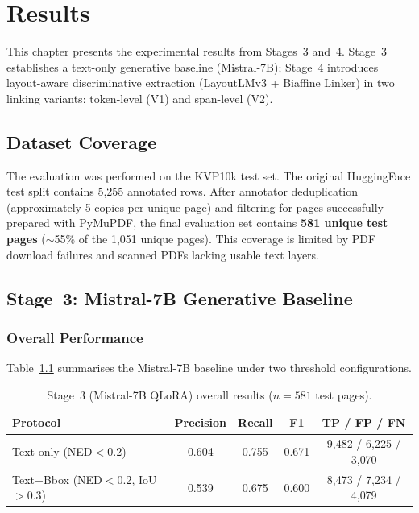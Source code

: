 \chapter{Results}
\label{ch:results}

This chapter presents the experimental results from Stages~3 and~4. Stage~3
establishes a text-only generative baseline (Mistral-7B); Stage~4 introduces
layout-aware discriminative extraction (LayoutLMv3 + Biaffine Linker) in two
linking variants: token-level (V1) and span-level (V2).

\section{Dataset Coverage}
\label{sec:dataset-coverage}

The evaluation was performed on the KVP10k test set. The original HuggingFace
test split contains 5{,}255 annotated rows. After annotator deduplication
(approximately 5 copies per unique page) and filtering for pages successfully
prepared with PyMuPDF, the final evaluation set contains \textbf{581 unique
test pages} ($\sim$55\% of the 1{,}051 unique pages). This coverage is
limited by PDF download failures and scanned PDFs lacking usable text layers.

\section{Stage~3: Mistral-7B Generative Baseline}
\label{sec:stage3-results}

\subsection{Overall Performance}

Table~\ref{tab:stage3-overall} summarises the Mistral-7B baseline under two
threshold configurations.

\begin{table}[ht]
  \centering
  \caption{Stage~3 (Mistral-7B QLoRA) overall results ($n = 581$ test pages).}
  \label{tab:stage3-overall}
  \begin{tabular}{@{}lcccc@{}}
    \toprule
    \textbf{Protocol} & \textbf{Precision} & \textbf{Recall} & \textbf{F1} & \textbf{TP / FP / FN} \\
    \midrule
    Text-only (NED$<$0.2) & 0.604 & 0.755 & 0.671 & 9{,}482 / 6{,}225 / 3{,}070 \\
    Text+Bbox (NED$<$0.2, IoU$>$0.3) & 0.539 & 0.675 & 0.600 & 8{,}473 / 7{,}234 / 4{,}079 \\
    \bottomrule
  \end{tabular}
\end{table}

